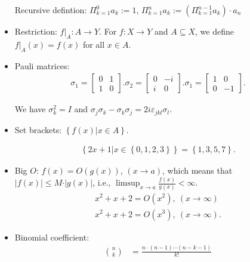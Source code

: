 \documentclass[../../note.tex]{subfiles}
\begin{document}
\begin{itemize}
    Recursive defintion: $\Pi_{k=1}^0 a_k:= 1$, $\Pi_{k=1}^n a_k := \left( \Pi_{k=1}^{n-1} a_k \right) \cdot a_n $
    \item Restriction: $f \vert_{A}: A \rightarrow Y$. For $f: X \rightarrow Y$ and $A \subseteq X$, we define $f \vert_{A}(x) = f(x)$ for all $x \in A$.
    \item Pauli matrices:
    \begin{align}
        \sigma_1 = \left[
        \begin{matrix}
            0 & 1 \\
            1 & 0
        \end{matrix}
        \right].
        \sigma_2 = \left[
            \begin{matrix}
                0 & -i \\
                i & 0
            \end{matrix}
        \right].
        \sigma_1 = \left[
            \begin{matrix}
                1 & 0 \\
                0 & -1
            \end{matrix}
        \right].
    \end{align}
    \begin{property}
        We have $\sigma_k^2 = I$ and $\sigma_j \sigma_k - \sigma_k \sigma_j = 2 i \varepsilon_{jkl} \sigma_l$.
    \end{property}
    \item Set brackets: $\left\{f(x) \vert x \in A \right\}$.
    \begin{example}
        \begin{align}
            \left\{ 2x+1 \vert x \in \left\{0,1,2,3\right\} \right\} = \left\{1,3,5,7\right\}.
        \end{align}
    \end{example}
    \item Big $O$: $f(x) = O(g(x))$, $(x \rightarrow a)$, which means that $\vert f(x) \vert \leq M \cdot \vert g(x) \vert$, i.e., $\limsup_{x\rightarrow a}{\frac{f(x)}{g(x)}} < \infty$.
    \begin{align}
        x^2+x+2 = O(x^2),~ (x \rightarrow \infty) \\
        x^2+x+2 = O(x^3),~ (x \rightarrow \infty).
    \end{align}
    \item Binomial coefficient: 
    \begin{align}
        \binom{n}{k} 
        &= \frac{n \cdot (n-1) \cdots (n-k-1)}{k !} \\

\end{align}
\end{itemize}
\end{document}
